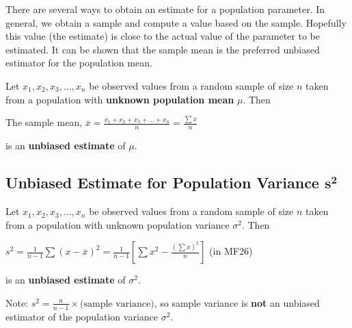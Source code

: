 \documentclass[11pt,a4paper]{book}
\begin{document}
There are several ways to obtain an estimate for a population parameter.
In general, we obtain a sample and compute a value based on the sample.
Hopefully this value (the estimate) is close to the actual value of
the parameter to be estimated. It can be shown that the sample mean
is the preferred unbiased estimator for the population mean. 

\begin{tcolorbox}[colback=blue!5, colframe=black, boxrule=.4pt, sharpish corners]

Let $x_{1},x_{2},x_{3},\ldots,x_{n}$ be observed values from a random
sample of size $n$ taken from a population with \textbf{unknown population
mean} $\mu$. Then 
\begin{center}
The sample mean, ${\displaystyle \overline{x}=\frac{x_{1}+x_{2}+x_{3}+\ldots+x_{n}}{n}=\frac{\sum x}{n}}$ 
\par\end{center}
is an\textbf{ unbiased estimate} of $\mu$.
\end{tcolorbox}


\subsection{Unbiased Estimate for Population Variance $\boldsymbol{s^{2}}$}

\begin{tcolorbox}[colback=blue!5, colframe=black, boxrule=.4pt, sharpish corners]

Let $x_{1},x_{2},x_{3},\ldots,x_{n}$ be observed values from a random
sample of size $n$ taken from a population with unknown population
variance $\sigma^{2}$. Then
\begin{center}
${\displaystyle s^{2}=\frac{1}{n-1}\sum\left(x-\overline{x}\right)^{2}=\frac{1}{n-1}\left[\sum x^{2}-\frac{\left(\sum x\right)^{2}}{n}\right]}$
(in MF26) 
\par\end{center}
\begin{flushleft}
is an\textbf{ unbiased estimate} of $\sigma^{2}$.
\par\end{flushleft}
\end{tcolorbox}

Note: ${\displaystyle s^{2}=\frac{n}{n-1}\times\text{(sample variance)}}$,
so sample variance is \textbf{not} an unbiased estimator of the population
variance $\sigma^{2}$.
\end{document}

